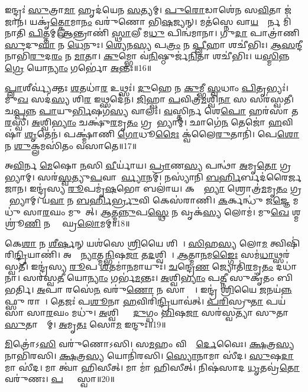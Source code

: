 𑌇𑌨𑍍𑌦𑍍𑌰𑌃॑ \ul{𑌸𑍁}𑌤𑍍𑌰𑌾\ul{𑌮𑌾} 𑌹𑍃𑌦॑𑌯𑍇𑌨 \ul{𑌸}𑌤𑍍𑌯𑌮𑍍।
\ul{𑌪𑍁}\ul{𑌰𑍋}𑌡𑌾𑌶𑍇॑𑌨 𑌸\ul{𑌵𑌿}𑌤𑌾 𑌜॑𑌜𑌾𑌨।
𑌯𑌕𑍃॑\ul{𑌤𑍍𑌕𑍍𑌲𑍋}𑌮𑌾\ul{𑌨𑌂} 𑌵𑌰𑍁॑𑌣𑍋 𑌭𑌿\ul{𑌷}𑌜𑍍𑌯𑌨𑍍।
𑌮𑌤॑𑌸𑍍𑌨𑍇 𑌵𑌾\ul{𑌯}𑌵𑍍𑌯𑍈᳚𑌰𑍍𑌨 𑌮𑌿॑𑌨𑌾𑌤𑌿 \ul{𑌪𑌿}𑌤𑍍𑌤𑌮𑍍।
\ul{𑌆}𑌨𑍍𑌤𑍍𑌰𑌾𑌣𑌿॑ \ul{𑌸𑍍𑌥𑌾}𑌲𑍀 𑌮\ul{𑌧𑍁} 𑌪𑌿𑌨𑍍𑌵॑𑌮𑌾𑌨𑌾।
𑌗𑍁\ul{𑌦𑌾} 𑌪𑌾𑌤𑍍𑌰𑌾॑𑌣𑌿 \ul{𑌸𑍁}𑌦𑍁\ul{𑌘𑌾} 𑌨 \ul{𑌧𑍇}𑌨𑍁𑌃।
\ul{𑌶𑍍𑌯𑍇}𑌨\ul{𑌸𑍍𑌯} 𑌪\ul{𑌤𑍍𑌰𑌂} 𑌨 \ul{𑌪𑍍𑌲𑍀}𑌹𑌾 𑌶𑌚𑍀॑𑌭𑌿𑌃।
\ul{𑌆}\ul{𑌸}𑌨𑍍𑌦𑍀 𑌨𑌾𑌭𑌿॑\ul{𑌰𑍁}𑌦\ul{𑌰𑌂} 𑌨 \ul{𑌮𑌾}𑌤𑌾।
\ul{𑌕𑍁}𑌮𑍍𑌭𑍋 𑌵॑\ul{𑌨𑌿}𑌷𑍍𑌠𑍁𑌰𑍍𑌜॑\ul{𑌨𑌿}𑌤𑌾 𑌶𑌚𑍀॑𑌭𑌿𑌃।
𑌯\ul{𑌸𑍍𑌮𑌿}𑌨𑍍𑌨\ul{𑌗𑍍𑌰𑍇} 𑌯𑍋\ul{𑌨𑍍𑌯𑌾𑌂} 𑌗𑌰𑍍𑌭𑍋॑ \ul{𑌅}𑌨𑍍𑌤𑌃॥16॥

\ul{𑌪𑍍𑌲𑌾}𑌶𑍀𑌰𑍍𑌵𑍍𑌯॑𑌕𑍍𑌤𑌃 \ul{𑌶}𑌤𑌧𑌾॑\ul{𑌰} 𑌉𑌥𑍍𑌸𑌃॑।
\ul{𑌦𑍁}𑌹𑍇 𑌨 \ul{𑌕𑍁}𑌮𑍍𑌭𑍀 \ul{𑌸𑍍𑌵}𑌧𑌾𑌂 \ul{𑌪𑌿}𑌤𑍃𑌭𑍍𑌯𑌃॑।
𑌮𑍁\ul{𑌖}\ul{} 𑌸𑌦॑\ul{𑌸𑍍𑌯} 𑌶𑌿\ul{𑌰} 𑌇𑌥𑍍𑌸𑌦𑍇॑𑌨।
\ul{𑌜𑌿}𑌹𑍍𑌵𑌾 \ul{𑌪}𑌵𑌿𑌤𑍍𑌰॑\ul{𑌮}𑌶𑍍𑌵𑌿\ul{𑌨𑌾} 𑌸 𑌸𑌰॑𑌸𑍍𑌵𑌤𑍀।
𑌚\ul{𑌪𑍍𑌪}𑌨𑍍𑌨 \ul{𑌪𑌾}𑌯𑍁\ul{𑌰𑍍𑌭𑌿}𑌷𑌗॑\ul{𑌸𑍍𑌯} 𑌵𑌾𑌲𑌃॑।
\ul{𑌵}𑌸𑍍𑌤𑌿𑌰𑍍𑌨 𑌶𑍇\ul{𑌪𑍋} 𑌹𑌰॑𑌸𑌾 𑌤\ul{𑌰}𑌸𑍍𑌵𑍀।
\ul{𑌅}𑌶𑍍𑌵𑌿\ul{𑌭𑍍𑌯𑌾𑌂} 𑌚𑌕𑍍𑌷𑍁॑\ul{𑌰}𑌮𑍃\ul{𑌤𑌂} 𑌗𑍍𑌰𑌹𑌾᳚𑌭𑍍𑌯𑌾𑌮𑍍।
𑌛𑌾𑌗𑍇॑\ul{𑌨} 𑌤𑍇𑌜𑍋॑ \ul{𑌹}𑌵𑌿𑌷𑌾॑ \ul{𑌶𑍃}𑌤𑍇𑌨॑।
𑌪𑌕𑍍𑌷𑍍𑌮𑌾॑𑌣𑌿 \ul{𑌗𑍋}𑌧𑍂\ul{𑌮𑍈𑌃} 𑌕𑍍𑌵॑𑌲𑍈\ul{𑌰𑍁}𑌤𑌾𑌨𑌿॑।
𑌪𑍇\ul{𑌶𑍋} 𑌨 \ul{𑌶𑍁}𑌕𑍍𑌲𑌮𑌸𑌿॑𑌤𑌂 𑌵𑌸𑌾𑌤𑍇॥17॥

𑌅\ul{𑌵𑌿}𑌰𑍍𑌨 \ul{𑌮𑍇}𑌷𑍋 \ul{𑌨}𑌸𑌿 \ul{𑌵𑍀}𑌰𑍍𑌯𑌾॑𑌯।
\ul{𑌪𑍍𑌰𑌾}𑌣\ul{𑌸𑍍𑌯} 𑌪𑌨𑍍𑌥𑌾॑ \ul{𑌅}𑌮𑍃\ul{𑌤𑍋} 𑌗𑍍𑌰𑌹𑌾᳚𑌭𑍍𑌯𑌾𑌮𑍍।
𑌸𑌰॑\ul{𑌸𑍍𑌵}𑌤𑍍𑌯𑍁\ul{𑌪}𑌵𑌾𑌕𑍈᳚\ul{𑌰𑍍𑌵𑍍𑌯𑌾}𑌨𑌮𑍍।
𑌨𑌸𑍍𑌯𑌾॑𑌨𑌿 \ul{𑌬}\ul{𑌰𑍍}𑌹𑌿𑌰𑍍𑌬𑌦॑𑌰𑍈𑌰𑍍𑌜𑌜𑌾𑌨।
𑌇𑌨𑍍𑌦𑍍𑌰॑𑌸𑍍𑌯 \ul{𑌰𑍂}𑌪𑌮𑍃॑\ul{𑌷}𑌭𑍋 𑌬𑌲𑌾॑𑌯।
𑌕𑌰𑍍𑌣𑌾᳚\ul{𑌭𑍍𑌯𑌾}\ul{} 𑌶𑍍𑌰𑍋𑌤𑍍𑌰॑\ul{𑌮}𑌮𑍃\ul{𑌤𑌂} 𑌗𑍍𑌰𑌹𑌾᳚𑌭𑍍𑌯𑌾𑌮𑍍।
𑌯\ul{𑌵𑌾} 𑌨 \ul{𑌬}\ul{𑌰𑍍}𑌹𑌿\ul{𑌰𑍍𑌭𑍍𑌰𑍁}𑌵𑌿 𑌕𑍇𑌸॑𑌰𑌾𑌣𑌿।
\ul{𑌕}𑌰𑍍𑌕𑌨𑍍𑌧𑍁॑ 𑌜\ul{𑌜𑍍𑌞𑍇} 𑌮𑌧𑍁॑ 𑌸𑌾\ul{𑌰}𑌘𑌂 𑌮𑍁𑌖𑌾᳚𑌤𑍍।
\ul{𑌆}𑌤𑍍𑌮\ul{𑌨𑍍𑌨𑍁}𑌪\ul{𑌸𑍍𑌥𑍇} 𑌨 𑌵𑍃𑌕॑\ul{𑌸𑍍𑌯} 𑌲𑍋𑌮॑।
𑌮𑍁\ul{𑌖𑍇} 𑌶𑍍𑌮𑌶𑍍𑌰𑍂॑\ul{𑌣𑌿} 𑌨 𑌵𑍍𑌯𑌾᳚𑌘𑍍𑌰\ul{𑌲𑍋}𑌮𑌮𑍍॥18॥

𑌕𑍇\ul{𑌶𑌾} 𑌨 \ul{𑌶𑍀}\ul{𑌰𑍍}𑌷𑌨𑍍‌ 𑌯𑌶॑𑌸𑍇 \ul{𑌶𑍍𑌰𑌿}𑌯𑍈 𑌶𑌿𑌖𑌾᳚।
\ul{𑌸𑌿}\ul{}𑌹\ul{𑌸𑍍𑌯} 𑌲𑍋\ul{𑌮} 𑌤𑍍𑌵𑌿𑌷𑌿॑𑌰𑌿\ul{𑌨𑍍𑌦𑍍𑌰𑌿}𑌯𑌾𑌣𑌿॑।
𑌅𑌙𑍍𑌗𑌾᳚\ul{𑌨𑍍𑌯𑌾}𑌤𑍍𑌮\ul{𑌨𑍍𑌭𑌿}𑌷\ul{𑌜𑌾} 𑌤\ul{𑌦}𑌶𑍍𑌵𑌿𑌨𑌾᳚।
\ul{𑌆}𑌤𑍍𑌮𑌾\ul{𑌨}𑌮\ul{𑌙𑍍𑌗𑍈𑌃} 𑌸𑌮॑\ul{𑌧𑌾}𑌥𑍍𑌸𑌰॑𑌸𑍍𑌵𑌤𑍀।
𑌇𑌨𑍍𑌦𑍍𑌰॑𑌸𑍍𑌯 \ul{𑌰𑍂}𑌪 \ul{𑌶}𑌤𑌮𑌾॑\ul{𑌨}𑌮𑌾𑌯𑍁𑌃॑।
\ul{𑌚}𑌨𑍍𑌦𑍍𑌰𑍇\ul{𑌣} 𑌜𑍍𑌯𑍋𑌤𑌿॑\ul{𑌰}𑌮𑍃\ul{𑌤𑌂} 𑌦𑌧𑌾॑𑌨𑌾।
𑌸𑌰॑𑌸𑍍𑌵\ul{𑌤𑍀} 𑌯𑍋\ul{𑌨𑍍𑌯𑌾𑌂} 𑌗𑌰𑍍𑌭॑\ul{𑌮}𑌨𑍍𑌤𑌃।
\ul{𑌅}𑌶𑍍𑌵𑌿\ul{𑌭𑍍𑌯𑌾𑌂} 𑌪\ul{𑌤𑍍𑌨𑍀} 𑌸𑍁𑌕𑍃॑𑌤𑌂 𑌬𑌿𑌭𑌰𑍍𑌤𑌿।
\ul{𑌅}𑌪𑌾 𑌰𑌸𑍇॑\ul{𑌨} 𑌵𑌰𑍁॑\ul{𑌣𑍋} 𑌨 𑌸𑌾𑌮𑍍𑌨𑌾᳚।
𑌇𑌨𑍍𑌦𑍍𑌰॑ \ul{𑌶𑍍𑌰𑌿}𑌯𑍈 \ul{𑌜}𑌨𑌯॑\ul{𑌨𑍍𑌨}𑌫𑍍𑌸𑍁 𑌰𑌾𑌜𑌾᳚।
𑌤𑍇𑌜𑌃॑ 𑌪\ul{𑌶𑍂}𑌨𑌾 \ul{𑌹}𑌵𑌿𑌰𑌿॑\ul{𑌨𑍍𑌦𑍍𑌰𑌿}𑌯𑌾𑌵॑𑌤𑍍।
\ul{𑌪}\ul{𑌰𑌿}𑌸𑍍𑌰𑍁\ul{𑌤𑌾} 𑌪𑌯॑𑌸𑌾 𑌸𑌾\ul{𑌰}𑌘𑌂 𑌮𑌧𑍁॑।
\ul{𑌅}𑌶𑍍𑌵𑌿𑌭𑍍𑌯𑌾𑌂᳚ \ul{𑌦𑍁}𑌗𑍍𑌧𑌂 \ul{𑌭𑌿}𑌷\ul{𑌜𑌾} 𑌸𑌰॑𑌸𑍍𑌵𑌤𑍍𑌯𑌾 𑌸𑍁𑌤𑌾\ul{𑌸𑍁}𑌤𑌾𑌭𑍍𑌯𑌾᳚𑌮𑍍।
\ul{𑌅}𑌮𑍃\ul{𑌤𑌃} 𑌸𑍋\ul{𑌮} 𑌇𑌨𑍍𑌦𑍁𑌃॑॥19॥\anuvakamend[𑌅𑌨𑍍𑌤॑𑌰 \ul{𑌆}𑌰𑌾\ul{𑌦}𑌨𑍍𑌤𑌰𑍍𑌵॑𑌸𑌾𑌤𑍇 𑌵𑍍𑌯𑌾𑌘𑍍𑌰\ul{𑌲𑍋}𑌮\dng{ꣳ} 𑌰𑌾𑌜𑌾॑ \ul{𑌚}𑌤𑍍𑌵𑌾𑌰𑌿॑ 𑌚]

\ul{𑌮𑌿}𑌤𑍍𑌰𑍋॑𑌽\ul{𑌸𑌿} 𑌵𑌰𑍁॑𑌣𑍋𑌽𑌸𑌿।
𑌸\ul{𑌮}𑌹𑌂 𑌵𑌿𑌶𑍍𑌵𑍈᳚\ul{𑌰𑍍𑌦𑍇}𑌵𑍈𑌃।
\ul{𑌕𑍍𑌷}𑌤𑍍𑌰\ul{𑌸𑍍𑌯} 𑌨𑌾𑌭𑌿॑𑌰𑌸𑌿।
\ul{𑌕𑍍𑌷}𑌤𑍍𑌰\ul{𑌸𑍍𑌯} 𑌯𑍋𑌨𑌿॑𑌰𑌸𑌿।
\ul{𑌸𑍍𑌯𑍋}𑌨𑌾𑌮𑌾 𑌸𑍀॑𑌦।
\ul{𑌸𑍁}𑌷\ul{𑌦𑌾}𑌮𑌾 𑌸𑍀॑𑌦।
𑌮𑌾 𑌤𑍍𑌵𑌾॑ 𑌹𑌿𑌸𑍀𑌤𑍍।
𑌮𑌾 𑌮𑌾॑ 𑌹𑌿𑌸𑍀𑌤𑍍।
𑌨𑌿𑌷॑𑌸𑌾𑌦 \ul{𑌧𑍃}𑌤𑌵𑍍𑌰॑\ul{𑌤𑍋} 𑌵𑌰𑍁॑𑌣𑌃।
\ul{𑌪}𑌸𑍍𑌤𑍍𑌯𑌾᳚𑌸𑍍𑌵𑌾॥20॥

